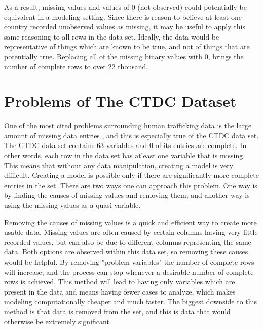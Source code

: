 \documentclass{article} %
\begin{document}
	As a result, missing values and values of 0 (not observed) could potentially be equivalent in a modeling setting. Since there is reason to believe at least one country recorded unobserved values as missing, it may be useful to apply this same reasoning to all rows in the data set. Ideally, the data would be representative of things which are known to be true, and not of things that are potentially true. Replacing all of the missing binary values with 0, brings the number of complete rows to over 22 thousand.
	

	\newpage
	
	
	
	
	
	
	
	
	
	
	
	
	
	
	
	
	
	\section{Problems of The CTDC Dataset}
	
	One of the most cited problems surrounding human trafficking data is the large amount of missing data entries \parencite{SlaveBook, polarisTypology}, and this is especially true of the CTDC data set. The CTDC data set contains 63 variables and 0 of its entries are complete. In other words, each row in the data set has atleast one variable that is missing. This means that without any data manipulation, creating a model is very difficult. Creating a model is possible only if there are significantly more complete entries in the set. There are two ways one can approach this problem. One way is by finding the causes of missing values and removing them, and another way is using the missing values as a quasi-variable. 
	
	Removing the causes of missing values is a quick and efficient way to create more usable data. Missing values are often caused by certain columns having very little recorded values, but can also be due to different columns representing the same data. Both options are observed within this data set, so removing these causes would be helpful. By removing "problem variables" the number of complete rows will increase, and the process can stop whenever a desirable number of complete rows is achieved. This method will lead to having only variables which are present in the data and means having fewer cases to analyze, which makes modeling computationally cheaper and much faster. The biggest downside to this method is that data is removed from the set, and this is data that would otherwise be extremely significant.
	
\end{document}
